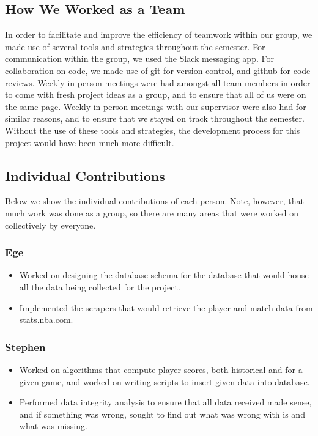 \subsection{How We Worked as a Team}
In order to facilitate and improve the efficiency of teamwork within our group, we made use of several tools and strategies throughout the semester. For communication within the group, we used the Slack messaging app. For collaboration on code, we made use of git for version control, and github for code reviews. Weekly in-person meetings were had amongst all team members in order to come with fresh project ideas as a group, and to ensure that all of us were on the same page. Weekly in-person meetings with our supervisor were also had for similar reasons, and to ensure that we stayed on track throughout the semester. Without the use of these tools and strategies, the development process for this project would have been much more difficult.

\subsection{Individual Contributions}
Below we show the individual contributions of each person. Note, however, that much work was done as a group, so there are many areas that were worked on collectively by everyone.

\subsubsection{Ege}
\begin{itemize}
  \item Worked on designing the database schema for the database that would house all the data being collected for the project.
  \item Implemented the scrapers that would retrieve the player and match data from stats.nba.com.
\end{itemize}
\subsubsection{Stephen}
\begin{itemize}
  \item Worked on algorithms that compute player scores, both historical and for a given game, and worked on writing scripts to insert given data into database.
  \item Performed data integrity analysis to ensure that all data received made sense, and if something was wrong, sought to find out what was wrong with is and what was missing.
\end{itemize}
